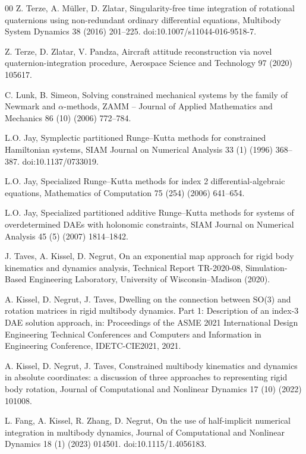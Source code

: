 \begin{thebibliography}{00}
Z. Terze, A. M\"uller, D. Zlatar,
Singularity-free time integration of rotational quaternions using non-redundant ordinary
differential equations,
Multibody System Dynamics 38 (2016) 201--225.
doi:10.1007/s11044-016-9518-7.

Z. Terze, D. Zlatar, V. Pandza,
Aircraft attitude reconstruction via novel quaternion-integration procedure,
Aerospace Science and Technology 97 (2020) 105617.

C. Lunk, B. Simeon,
Solving constrained mechanical systems by the family of Newmark and $\alpha$-methods,
ZAMM -- Journal of Applied Mathematics and Mechanics 86 (10) (2006) 772--784.

L.O. Jay,
Symplectic partitioned Runge--Kutta methods for constrained Hamiltonian systems,
SIAM Journal on Numerical Analysis 33 (1) (1996) 368--387.
doi:10.1137/0733019.

L.O. Jay,
Specialized Runge--Kutta methods for index 2 differential-algebraic equations,
Mathematics of Computation 75 (254) (2006) 641--654.

L.O. Jay,
Specialized partitioned additive Runge--Kutta methods for systems of overdetermined DAEs with
holonomic constraints,
SIAM Journal on Numerical Analysis 45 (5) (2007) 1814--1842.

J. Taves, A. Kissel, D. Negrut,
On an exponential map approach for rigid body kinematics and dynamics analysis,
Technical Report TR-2020-08, Simulation-Based Engineering Laboratory, University of
Wisconsin--Madison (2020).

A. Kissel, D. Negrut, J. Taves,
Dwelling on the connection between SO(3) and rotation matrices in rigid multibody dynamics.
Part 1: Description of an index-3 DAE solution approach,
in: Proceedings of the ASME 2021 International Design Engineering Technical Conferences and
Computers and Information in Engineering Conference, IDETC-CIE2021, 2021.

A. Kissel, D. Negrut, J. Taves,
Constrained multibody kinematics and dynamics in absolute coordinates: a discussion of three
approaches to representing rigid body rotation,
Journal of Computational and Nonlinear Dynamics 17 (10) (2022) 101008.

L. Fang, A. Kissel, R. Zhang, D. Negrut,
On the use of half-implicit numerical integration in multibody dynamics,
Journal of Computational and Nonlinear Dynamics 18 (1) (2023) 014501.
doi:10.1115/1.4056183.


\end{thebibliography}
